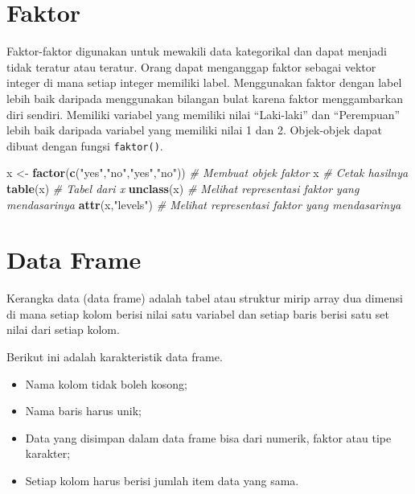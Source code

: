 \documentclass[
]{book}
\newenvironment{Shaded}{\begin{snugshade}}{\end{snugshade}}
\newcommand{\CommentTok}[1]{\textcolor[rgb]{0.56,0.35,0.01}{\textit{#1}}}
\newcommand{\FunctionTok}[1]{\textcolor[rgb]{0.13,0.29,0.53}{\textbf{#1}}}
\newcommand{\NormalTok}[1]{#1}
\newcommand{\OtherTok}[1]{\textcolor[rgb]{0.56,0.35,0.01}{#1}}
\newcommand{\StringTok}[1]{\textcolor[rgb]{0.31,0.60,0.02}{#1}}
\providecommand{\tightlist}{%
  \setlength{\itemsep}{0pt}\setlength{\parskip}{0pt}}
\begin{document}
\hypertarget{faktor}{%
\section{Faktor}\label{faktor}}

Faktor-faktor digunakan untuk mewakili data kategorikal dan dapat menjadi tidak teratur atau teratur. Orang dapat menganggap faktor sebagai vektor integer di mana setiap integer memiliki label. Menggunakan faktor dengan label lebih baik daripada menggunakan bilangan bulat karena faktor menggambarkan diri sendiri. Memiliki variabel yang memiliki nilai ``Laki-laki'' dan ``Perempuan'' lebih baik daripada variabel yang memiliki nilai 1 dan 2. Objek-objek dapat dibuat dengan fungsi \texttt{faktor()}.

\begin{Shaded}
\begin{Highlighting}[]
\NormalTok{x }\OtherTok{\textless{}{-}} \FunctionTok{factor}\NormalTok{(}\FunctionTok{c}\NormalTok{(}\StringTok{"yes"}\NormalTok{,}\StringTok{"no"}\NormalTok{,}\StringTok{"yes"}\NormalTok{,}\StringTok{"no"}\NormalTok{))  }\CommentTok{\# Membuat objek faktor}
\NormalTok{x                                      }\CommentTok{\# Cetak hasilnya}
\FunctionTok{table}\NormalTok{(x)                               }\CommentTok{\# Tabel dari \textasciigrave{}x\textasciigrave{}}
\FunctionTok{unclass}\NormalTok{(x)                             }\CommentTok{\# Melihat representasi faktor yang mendasarinya}
\FunctionTok{attr}\NormalTok{(x,}\StringTok{"levels"}\NormalTok{)                       }\CommentTok{\# Melihat representasi faktor yang mendasarinya}
\end{Highlighting}
\end{Shaded}

\hypertarget{data-frame}{%
\section{Data Frame}\label{data-frame}}

Kerangka data (data frame) adalah tabel atau struktur mirip array dua dimensi di mana setiap kolom berisi nilai satu variabel dan setiap baris berisi satu set nilai dari setiap kolom.

Berikut ini adalah karakteristik data frame.

\begin{itemize}
\tightlist
\item
  Nama kolom tidak boleh kosong;
\item
  Nama baris harus unik;
\item
  Data yang disimpan dalam data frame bisa dari numerik, faktor atau tipe karakter;
\item
  Setiap kolom harus berisi jumlah item data yang sama.
\end{itemize}
\end{document}
